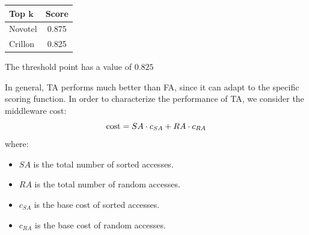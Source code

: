 \documentclass[12pt, a4paper]{report}
\begin{document}
\begin{example}
        \begin{table}[H]
            \centering
            \begin{tabular}{|lc|}
            \hline
            \textbf{Top $\boldsymbol{k}$} & \textbf{Score} \\ \hline
            Novotel                       & 0.875          \\ 
            Crillon                       & 0.825          \\ \hline
            \end{tabular}
        \end{table}
        The threshold point has a value of $0.825$
    \end{example}
    In general, TA performs much better than FA, since it can adapt to the specific scoring function. In order to characterize the 
    performance of TA, we consider the middleware cost: 
    \[\textnormal{cost} = SA \cdot c_{SA} + RA \cdot c_{RA}\]
    where:
    \begin{itemize}
        \item $SA$ is the total number of sorted accesses.
        \item $RA$ is the total number of random accesses.
        \item $c_{SA}$ is the base cost of sorted accesses.
        \item $c_{RA}$ is the base cost of random accesses.
    \end{itemize}
\end{document}
